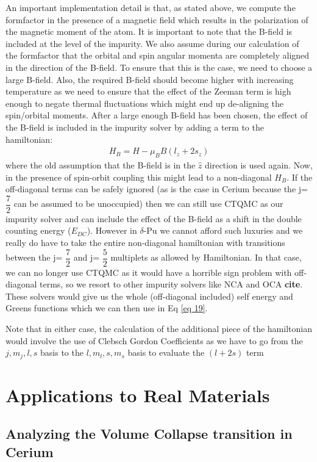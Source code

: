 \documentclass[10pt]{ruthesis}
\begin{document}
{An important implementation detail is that, as stated above, we compute the formfactor in the presence of a magnetic field which results in the polarization of the magnetic moment of the atom. It is important to note that the B-field is included at the level of the impurity. We also assume during our calculation of the formfactor that the orbital and spin angular momenta are completely aligned in the direction of the B-field. To ensure that this is the case, we need to choose a large B-field. Also, the required B-field should become higher with increasing temperature as we need to ensure that the effect of the Zeeman term is high enough to negate thermal fluctuations which might end up de-aligning the spin/orbital moments.
After a large enough B-field has been chosen, the effect of the B-field is included in the impurity solver by adding a term to the hamiltonian:
\begin{align}
H_{B}=H-\mu_{B}B(l_{z}+2s_{z})
\end{align} 
where the old assumption that the B-field is in the $\hat{z}$ direction is used again. Now, in the presence of spin-orbit coupling this might lead to a non-diagonal $H_{B}$. If the off-diagonal terms can be safely ignored (as is the case in Cerium because the j= $\dfrac{7}{2}$ can be assumed to be unoccupied) then we can still use CTQMC as our impurity solver and can include the effect of the B-field as a shift in the double counting energy ($E_{DC}$). However in $\delta$-Pu we cannot afford such luxuries and we really do have to take the entire non-diagonal hamiltonian with transitions between the  j= $\dfrac{7}{2}$ and  j= $\dfrac{5}{2}$ multiplets as allowed by Hamiltonian. In that case, we can no longer use CTQMC as it would have a horrible sign problem with off-diagonal terms, so we resort to other impurity solvers like NCA and OCA \textbf{cite}. These solvers would give us the whole (off-diagonal included) self energy and Greens functions which we can then use in Eq \ref{eq 19}.

Note that in either case, the calculation of the additional piece of the hamiltonian would involve the use of Clebsch Gordon Coefficients as we have to go from the $j,m_{j}, l,s$ basis to the $l,m_{l},s,m_{s}$ basis to evaluate the $(l+2s)$ term 

\section{Applications to Real Materials}
\subsection{Analyzing the Volume Collapse transition in Cerium}

}
\end{document}
